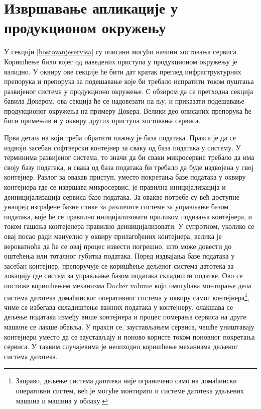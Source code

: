 \documentclass[12pt,oneside]{memoir}
\begin{document}
\section{Извршавање апликације у продукционом окружењу}
У секцији \ref{hostovanjeservisa} су описани могући начини хостовања сервиса. Коришћење било којег од наведених приступа у продукционом окружењу је валидно. У оквиру ове секције ће бити дат кратак преглед инфраструктурних препорука и препорука за подешавање које би требало испратити током пуштања развијеног система у продукционо окружење. С обзиром да се претходна секција бавила Докером, ова секција ће се надовезати на њу, и приказати подешавање продукционог окружења на примеру Докера. Велики део описаних препорука ће бити примењив и у оквиру других приступа хостовања сервиса.

Прва детаљ на који треба обратити пажњу је база података. Пракса је да се издвоји засебан софтверски контејнер за сваку од база података у систему. У терминима развијеног система, то значи да би сваки микросервис требало да има своју базу података, и свака од база података би требало да буде издвојена у свој контејнер. Разлог за овакав приступ, уместо покретања базе података у оквиру контејнера где се извршава микросервис, је правилна иницијализација и деиницијализација сервиса базе података. За овакве потребе су већ доступне унапред изграђене базне слике за различите системе за управљање базом података, које ће се правилно иницијализовати приликом подизања контејнера, и током гашења контејенера правилно деиницијализовати. У супротном, уколико се овај посао ради мануелно у оквиру прилагођених контејнера, велика је вероватноћа да ће се овај процес извести погрешно, што може довести до оштећења или тоталног губитка података. Поред издвајања базе података у засебан контејнер, препоручује се коришћење дељеног система датотека за локацију где систем за управљање базом података складишти податке. Ово се постиже коришћењем механизма Docker volume \cite{dockervolume} који омогућава монтирање дела система датотека домаћинског оперативног система у оквиру самог контејнера\footnote{Заправо, дељење система датотека није ограничено само на домаћински оперативни систем, већ је могуће монтирати и системе датотека удаљених машина и машина у облаку.}, чиме се избегава складиштење важних података у контејнеру, олакшава се дељење података између више контејнера и процес померања сервиса на друге машине се лакше обавља. У пракси се, заустављањем сервиса, чешће уништавају контејнери уместо да се заустављају и поново користе током поновног покретања сервиса. У таквим случајевима је неопходно коришћење механизма дељеног система датотека.
\end{document}
